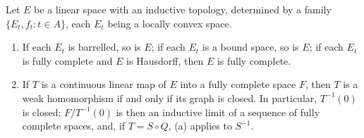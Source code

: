 Let $E$ be a linear space with an inductive topology, determined by a family $\{E_t, f_t : t \in A\}$, each $E_t$ being a locally convex space.
\begin{enumerate}
    \item[(a)] If each $E_t$ is barrelled, so is $E$; if each $E_t$ is a bound space, so is $E$; if each $E_t$ is fully complete and $E$ is Hausdorff, then $E$ is fully complete.
    \item[(b)] If $T$ is a continuous linear map of $E$ into a fully complete space $F$, then $T$ is a weak homomorphism if and only if its graph is closed. In particular, $T^{-1}(0)$ is closed; $F/T^{-1}(0)$ is then an inductive limit of a sequence of fully complete spaces, and, if $T = S \circ Q$, (a) applies to $S^{-1}$.
\end{enumerate}
